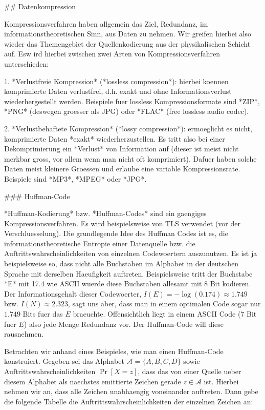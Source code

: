## Datenkompression

Kompressionsverfahren haben allgemein das Ziel, Redundanz, im
informationstheoretischen Sinn, aus Daten zu nehmen. Wir greifen hierbei also
wieder das Themengebiet der Quellenkodierung aus der physikalischen Schicht
auf. Esw ird hierbei zwischen zwei Arten von Kompressionsverfahren
unterschieden:

1. *Verlustfreie Kompression* (*lossless compression*): hierbei koennen
   komprimierte Daten verlustfrei, d.h. exakt und ohne Informationsverlust
   wiederhergestellt werden. Beispiele fuer lossless Kompressionsformate sind
   *ZIP*, *PNG* (deswegen groesser als JPG) oder *FLAC* (free lossless audio
   codec).

2. *Verlustbehaftete Kompression* (*lossy compression*): ermoeglicht es nicht,
   komprimierte Daten *exakt* wiederherzustellen. Es tritt also bei einer
   Dekomprimierung ein *Verlust* von Information auf (dieser ist meist nicht
   merkbar gross, vor allem wenn man nicht oft komprimiert). Dafuer haben solche
   Daten meist kleinere Groessen und erlaube eine variable
   Kompressionsrate. Beispiele sind *MP3*, *MPEG* oder *JPG*.

### Huffman-Code

*Huffman-Kodierung* bzw. *Huffman-Codes* sind ein gaengiges
Kompressionsverfahren. Es wird beispielsweise von TLS verwendet (vor der
Verschluesselung). Die grundlegende Idee des Huffman Codes ist es, die
informationstheoretische Entropie einer Datenquelle bzw. die
Auftrittswahrscheinlichkeiten von einzelnen Codewoertern auszunutzen. Es ist ja
beispielsweise so, dass nicht alle Buchstaben im Alphabet in der deutschen
Sprache mit derselben Haeufigkeit auftreten. Beispielsweise tritt der Buchstabe
*E* mit 17.4%
wie ASCII wuerde diese Buchstaben allesamt mit 8 Bit kodieren. Der
Informationsgehalt dieser Codewoerter, $I(E) = -\log(0.174) \approx 1.749$
bzw. $I(N) \approx 2.323$, sagt uns aber, dass man in einem optimalen Code sogar
nur $1.749$ Bits fuer das $E$ braeuchte. Offensichtlich liegt in einem ASCII
Code (7 Bit fuer $E$) also jede Menge Redundanz vor. Der Huffman-Code will diese
rausnehmen.

Betrachten wir anhand eines Beispieles, wie man einen Huffman-Code
konstruiert. Gegeben sei das Alphabet $\mathcal{A} = \{A, B, C, D\}$ sowie
Auftrittswahrscheinlichkeiten $\Pr[X = z]$, dass das von einer Quelle ueber
diesem Alphabet als naechstes emittierte Zeichen gerade $z \in \mathcal{A}$
ist. Hierbei nehmen wir an, dass alle Zeichen unabhaengig voneinander
auftreten. Dann gebe die folgende Tabelle die Auftrittswahrscheinlichkeiten der
einzelnen Zeichen an:

